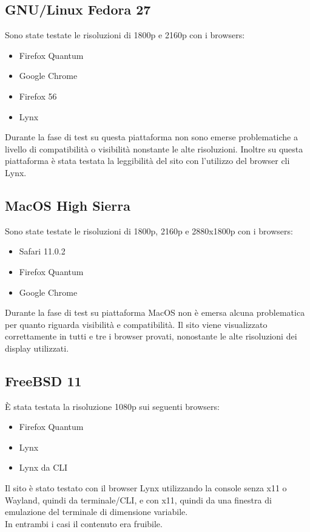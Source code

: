 \documentclass[openany, a4paper, 12pt]{report}
\begin{document}
				\subsection{GNU/Linux Fedora 27}
				Sono state testate le risoluzioni di 1800p e 2160p con i browsers:
				\begin{itemize}
					\item Firefox Quantum
					\item Google Chrome
					\item Firefox 56
					\item Lynx
				\end{itemize}
				Durante la fase di test su questa piattaforma non sono emerse problematiche a livello di compatibilità o visibilità nonstante le alte risoluzioni. Inoltre su questa piattaforma è stata testata la leggibilità del sito con l'utilizzo del browser cli Lynx.

				\subsection{MacOS High Sierra}
				Sono state testate le risoluzioni di 1800p, 2160p e 2880x1800p con i browsers:
				\begin{itemize}
					\item Safari 11.0.2
					\item Firefox Quantum
					\item Google Chrome
				\end{itemize}
				Durante la fase di test su piattaforma MacOS non è emersa alcuna problematica per quanto riguarda visibilità e compatibilità. Il sito viene visualizzato correttamente in tutti e tre i browser provati, nonostante le alte risoluzioni dei display utilizzati.

				\subsection{FreeBSD 11}
				\`{E} stata testata la risoluzione 1080p sui seguenti browsers:
				\begin{itemize}
					\item Firefox Quantum
					\item Lynx
					\item Lynx da CLI
				\end{itemize}
				Il sito è stato testato con il browser Lynx utilizzando la console senza x11 o Wayland, quindi da terminale/CLI, e con x11, quindi da una finestra di emulazione del terminale di dimensione variabile.\\
				In entrambi i casi il contenuto era fruibile.
\end{document}
